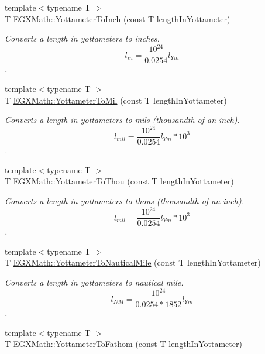 \begin{DoxyCompactItemize}
{\footnotesize template$<$typename T $>$ }\\T \mbox{\hyperlink{group___e_g_x_math-_conversions-_length_conversions-_s_i-_yottameter-_imperial_ga6de8b1bd4812d6814328cb5d54adf08c}{E\+G\+X\+Math\+::\+Yottameter\+To\+Inch}} (const T length\+In\+Yottameter)
\begin{DoxyCompactList}\small\item\em Converts a length in yottameters to inches. \[ l_{in}= \frac{10^{24}}{0.0254} l_{Ym} \]. \end{DoxyCompactList}\item 
{\footnotesize template$<$typename T $>$ }\\T \mbox{\hyperlink{group___e_g_x_math-_conversions-_length_conversions-_s_i-_yottameter-_imperial_ga71ee7b2256fffaec2663bd2eafc30a9d}{E\+G\+X\+Math\+::\+Yottameter\+To\+Mil}} (const T length\+In\+Yottameter)
\begin{DoxyCompactList}\small\item\em Converts a length in yottameters to mils (thousandth of an inch). \[ l_{mil}= \frac{10^{24}}{0.0254} l_{Ym} * 10^{3} \]. \end{DoxyCompactList}\item 
{\footnotesize template$<$typename T $>$ }\\T \mbox{\hyperlink{group___e_g_x_math-_conversions-_length_conversions-_s_i-_yottameter-_imperial_ga9bf8eeca799b8246932d4aeaac425d87}{E\+G\+X\+Math\+::\+Yottameter\+To\+Thou}} (const T length\+In\+Yottameter)
\begin{DoxyCompactList}\small\item\em Converts a length in yottameters to thous (thousandth of an inch). \[ l_{mil}= \frac{10^{24}}{0.0254} l_{Ym} * 10^{3} \]. \end{DoxyCompactList}\item 
{\footnotesize template$<$typename T $>$ }\\T \mbox{\hyperlink{group___e_g_x_math-_conversions-_length_conversions-_s_i-_yottameter-_nautical_ga455b7f16dd9ff68f759f366def111300}{E\+G\+X\+Math\+::\+Yottameter\+To\+Nautical\+Mile}} (const T length\+In\+Yottameter)
\begin{DoxyCompactList}\small\item\em Converts a length in yottameters to nautical mile. \[ l_{NM}= \frac{10^{24}}{0.0254 * 1852} l_{Ym} \]. \end{DoxyCompactList}\item 
{\footnotesize template$<$typename T $>$ }\\T \mbox{\hyperlink{group___e_g_x_math-_conversions-_length_conversions-_s_i-_yottameter-_nautical_ga602afc490045a91db8931798e6ee4bbd}{E\+G\+X\+Math\+::\+Yottameter\+To\+Fathom}} (const T length\+In\+Yottameter)

\end{DoxyCompactItemize}
